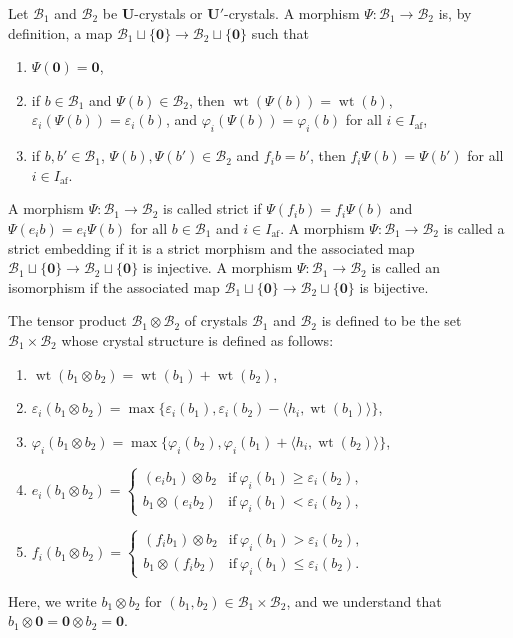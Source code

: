 \documentclass[10pt]{amsart}
\theoremstyle{definition}\newtheorem{defi}[theo]{Definition}
\theoremstyle{remark}\newtheorem{rema}[theo]{Remark}
\newcommand\bm[1]{\boldsymbol{#1}}
\newcommand{\U}{\mathbf{U}}
\DeclareMathOperator{\af}{af}
\DeclareMathOperator{\wt}{wt}
\begin{document}
Let 
$\mathcal{B}_1$
and 
$\mathcal{B}_2$
be $\U$-crystals or $\U'$-crystals.
A morphism 
$\Psi : \mathcal{B}_1 \rightarrow \mathcal{B}_2$
is, by definition, a map
$\mathcal{B}_1 \sqcup \{ \bm{0} \} \rightarrow \mathcal{B}_2 \sqcup \{ \bm{0} \}$
such that 
\begin{enumerate}[label=(M\arabic*)]
\item
$\Psi (\bm{0}) = \bm{0}$, 
\item
if 
$b \in \mathcal{B}_1$ 
and 
$\Psi(b) \in \mathcal{B}_2$, 
then 
$\wt (\Psi(b)) = \wt (b)$, 
$\varepsilon_i (\Psi(b)) = \varepsilon_i (b)$, and
$\varphi_i(\Psi(b)) = \varphi_i(b)$ 
for all 
$i \in I_{\af}$, 
\item
if
$b , b' \in \mathcal{B}_1$, 
$\Psi(b) , \Psi(b') \in \mathcal{B}_2$ and 
$f_i b = b'$, 
then
$f_i \Psi(b) = \Psi(b')$
for all 
$i \in I_{\af}$. 
\end{enumerate}
A morphism
$\Psi : \mathcal{B}_1 \rightarrow \mathcal{B}_2$
is called strict if 
$\Psi(f_i b) = f_i \Psi (b)$
and 
$\Psi(e_i b) = e_i \Psi (b)$
for all 
$b \in \mathcal{B}_1$ and $i \in I_{\af}$.
A morphism
$\Psi : \mathcal{B}_1 \rightarrow \mathcal{B}_2$
is called a strict embedding if it is a strict morphism and the associated map 
$\mathcal{B}_1 \sqcup \{ \bm{0} \} \rightarrow \mathcal{B}_2 \sqcup \{ \bm{0} \}$
is injective. A morphism
$\Psi : \mathcal{B}_1 \rightarrow \mathcal{B}_2$
is called an isomorphism if the associated map 
$\mathcal{B}_1 \sqcup \{ \bm{0} \} \rightarrow \mathcal{B}_2 \sqcup \{ \bm{0} \}$
is bijective.

The tensor product
$\mathcal{B}_1 \otimes \mathcal{B}_2$ 
of crystals
$\mathcal{B}_1$
and 
$\mathcal{B}_2$ 
is defined to be the set 
$\mathcal{B}_1 \times \mathcal{B}_2$ 
whose crystal structure is defined as follows: 
\begin{enumerate}[label=(T\arabic*)]
\item
$\wt (b_1 \otimes b_2) = \wt (b_1) + \wt (b_2)$, 
\item
$\varepsilon_i (b_1 \otimes b_2) 
= 
\max \{ \varepsilon_i(b_1) , \varepsilon_i(b_2) - \langle h_i , \wt (b_1) \rangle \}$, 
\item
$\varphi_i (b_1 \otimes b_2) 
= 
\max \{ \varphi_i(b_2) , \varphi_i(b_1) + \langle h_i , \wt (b_2) \rangle \}$, 
\item
$e_i (b_1 \otimes b_2) 
=
\begin{cases}
(e_i b_1) \otimes b_2 
&\text{if} \ \varphi_i(b_1) \geq \varepsilon_i(b_2), \\
b_1 \otimes (e_i b_2) 
&\text{if} \ \varphi_i(b_1) < \varepsilon_i(b_2),
\end{cases}$
\item
$f_i (b_1 \otimes b_2) 
=
\begin{cases}
(f_i b_1) \otimes b_2 
&\text{if} \ \varphi_i(b_1) > \varepsilon_i(b_2), \\
b_1 \otimes (f_i b_2) 
&\text{if} \ \varphi_i(b_1) \leq \varepsilon_i(b_2).
\end{cases}$
\end{enumerate}
Here, we write 
$b_1 \otimes b_2$ 
for 
$(b_1 , b_2) \in \mathcal{B}_1 \times \mathcal{B}_2$, 
and we understand that
$b_1 \otimes \bm{0} = \bm{0} \otimes b_2 = \bm{0}$. 
\end{document}
